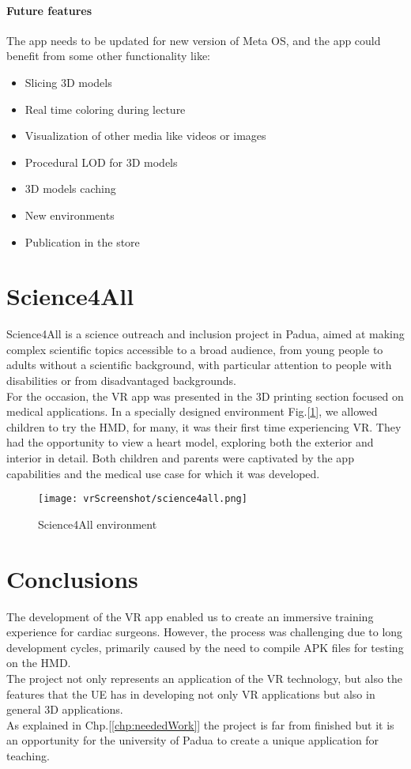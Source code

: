 \paragraph{Future features}
The app needs to be updated for new version of Meta OS, and the app could benefit from some other functionality like:

\begin{itemize}
  \item	Slicing 3D models
  \item Real time coloring during lecture
  \item Visualization of other media like videos or images
  \item Procedural \ac{LOD} for 3D models
  \item	3D models caching 
  \item	New environments
  \item Publication in the store
\end{itemize}

\section{Science4All}
\noindent
Science4All is a science outreach and inclusion project in Padua, aimed at making complex scientific topics accessible to a broad audience,
from young people to adults without a scientific background, with particular attention to people with disabilities or from disadvantaged backgrounds.\\
For the occasion, the \ac{VR} app was presented in the 3D printing section focused on medical applications. In a specially designed environment Fig.[\ref{fig:science4all}], we allowed children to try the \ac{HMD}, for many, it was their first time experiencing \ac{VR}. They had the opportunity to view a heart model, exploring both the exterior and interior in detail.
Both children and parents were captivated by the app capabilities and the medical use case for which it was developed.

\begin{figure}[ht]
  \centering
  \texttt{[image: vrScreenshot/science4all.png]}
  \caption{Science4All environment}
  \label{fig:science4all}
\end{figure}

\section{Conclusions}
\noindent
The development of the \ac{VR} app enabled us to create an immersive training experience for cardiac surgeons.
However, the process was challenging due to long development cycles, primarily caused by the need to compile \ac{APK} files for testing on the \ac{HMD}.\\
The project not only represents an application of the \ac{VR} technology, but also the features  that the \ac{UE} has in developing not only \ac{VR} applications but also in general 3D applications.\\
As explained in Chp.[\ref{chp:neededWork}] the project is far from finished but it is an opportunity for the university of Padua to create a unique application for teaching.\\